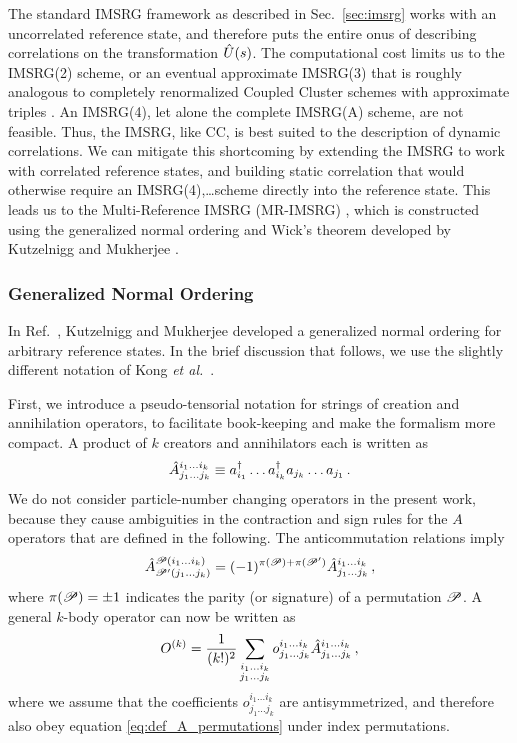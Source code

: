 {The standard IMSRG framework as described in Sec.~\ref{sec:imsrg} works
with an uncorrelated reference state, and therefore puts the entire onus
of describing correlations on the transformation $\hat{U}(s)$. The
computational cost limits us to the IMSRG(2) scheme, or an eventual
approximate IMSRG(3) that is roughly analogous to completely renormalized  
Coupled Cluster schemes with approximate triples \cite{Binder:2013fk}. An 
IMSRG(4), let alone the complete IMSRG(A) scheme, are not feasible. Thus, 
the IMSRG, like CC, is best suited to the description of dynamic correlations.
We can mitigate this shortcoming by extending the IMSRG to work with correlated
reference states, and building static correlation that would otherwise require
an IMSRG(4),\ldots scheme directly into the reference state. This leads us to
the Multi-Reference IMSRG (MR-IMSRG) \cite{Hergert:2013ij,Hergert:2014vn,Hergert:2017kx}, 
which is constructed using the generalized normal ordering and Wick's
theorem developed by Kutzelnigg and Mukherjee \cite{Kutzelnigg:1997fk,Mukherjee:1997yg}.

%
%
\subsubsection{Generalized Normal Ordering}
In Ref.~\cite{Kutzelnigg:1997fk}, Kutzelnigg and Mukherjee developed a 
generalized normal ordering for arbitrary reference states. In the brief
discussion that follows, we use the slightly different notation of 
Kong \emph{et al.}~\cite{Kong:2010kx}.

First, we introduce a pseudo-tensorial notation for strings of creation 
and annihilation operators, to facilitate book-keeping and make the formalism
more compact. A product of $k$ creators and annihilators each is written as
\begin{equation}
  \hat{A}^{i_1\ldots i_k}_{j_1\ldots j_k}\equiv
  a^\dag_{i_1}\ldots a^\dag_{i_k}a_{j_k}\ldots a_{j_1}\,.
\end{equation}
We do not consider particle-number changing operators in the present work,
because they cause ambiguities in the contraction and sign rules for the
$A$ operators that are defined in the following. The anticommutation relations 
imply
\begin{equation}\label{eq:def_A_permutations}
  \AO^{\PC(i_1 \ldots i_k)}_{\PC'(j_1 \ldots j_k)} 
  = (-1)^{\pi(\PC)+\pi(\PC')} \AO^{i_1\ldots i_k}_{j_1\ldots j_k}\,,
\end{equation}
where $\pi(\mathcal{P})=\pm1$ indicates the parity (or signature) of a permutation 
$\mathcal{P}$. A general $k$-body operator can now be written as
\begin{equation}
 O^{(k)} = \frac{1}{(k!)^2}\sum_{\substack{i_1\ldots i_k\\j_1\ldots j_k}}
  o^{i_1\ldots i_k}_{j_1\ldots j_k}\hat{A}^{i_1\ldots i_k}_{j_1\ldots j_k}\,,
\end{equation}
where we assume that the coefficients $o^{i_1\ldots i_k}_{j_1\ldots j_k}$
are antisymmetrized, and therefore also obey equation \eqref{eq:def_A_permutations}
under index permutations. 

}
